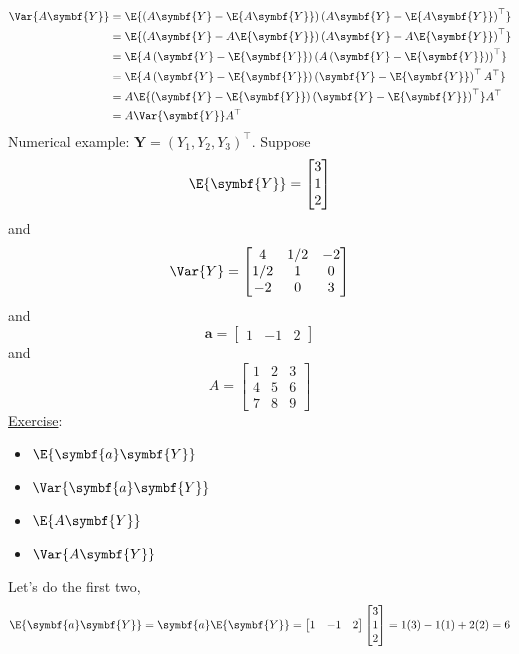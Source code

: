 \begin{align*}
    \Var{A\symbf{Y}}
     & =\E{\left(A\symbf{Y}-\E{A\symbf{Y}}\right)
        \left(A\symbf{Y}-\E{A\symbf{Y}}\right)^\top}                                                 \\
     & =\E{\left( A\symbf{Y}-A\E{\symbf{Y}} \right)
        \left( A\symbf{Y}-A\E{\symbf{Y}} \right)^\top}                                               \\
     & =\E{A\left( \symbf{Y}-\E{\symbf{Y}} \right)
        \left( A\left( \symbf{Y}-\E{\symbf{Y}} \right) \right)^\top}                                 \\
     & =\E{A\left( \symbf{Y}-\E{\symbf{Y}} \right)
        \left( \symbf{Y}-\E{\symbf{Y}} \right)^\top A^\top}                                          \\
     & =A\E{\left( \symbf{Y}-\E{\symbf{Y}} \right)\left( \symbf{Y}-\E{\symbf{Y}} \right)^\top}A^\top \\
     & =A\Var{\symbf{Y}}A^\top
\end{align*}
Numerical example: $ \symbf{Y}=(Y_1,Y_2,Y_3)^\top $. Suppose
\[ \E{\symbf{Y}}=\begin{bmatrix}
        3 \\
        1 \\
        2
    \end{bmatrix} \]
and
\[ \Var{Y}=\begin{bmatrix}
        4   & 1/2 & -2 \\
        1/2 & 1   & 0  \\
        -2  & 0   & 3
    \end{bmatrix} \]
and
\[ \symbf{a}=\begin{bmatrix}
        1 & -1 & 2
    \end{bmatrix} \]
and
\[ A=\begin{bmatrix}
        1 & 2 & 3 \\
        4 & 5 & 6 \\
        7 & 8 & 9
    \end{bmatrix} \]
\underline{Exercise}:
\begin{itemize}
    \item $ \E{\symbf{a}\symbf{Y}} $
    \item $ \Var{\symbf{a}\symbf{Y}} $
    \item $ \E{A\symbf{Y}} $
    \item $ \Var{A\symbf{Y}} $
\end{itemize}
Let's do the first two,
\[ \E{\symbf{a}\symbf{Y}}=\symbf{a}\E{\symbf{Y}}=
    \begin{bmatrix}
        1 & -1 & 2
    \end{bmatrix}\begin{bmatrix}
        3 \\
        1 \\
        2
    \end{bmatrix}=1(3)-1(1)+2(2)=6 \]
